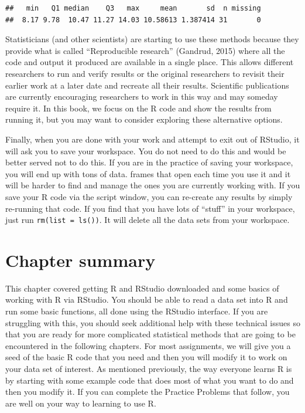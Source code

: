\documentclass[]{book}
\newenvironment{Shaded}{\begin{snugshade}}{\end{snugshade}}
\newcommand{\KeywordTok}[1]{\textcolor[rgb]{0.13,0.29,0.53}{\textbf{{#1}}}}
\newcommand{\NormalTok}[1]{{#1}}
\begin{document}
\begin{Shaded}
\end{Shaded}

\begin{verbatim}
##   min   Q1 median    Q3   max     mean       sd  n missing
##  8.17 9.78  10.47 11.27 14.03 10.58613 1.387414 31       0
\end{verbatim}

Statisticians (and other scientists) are starting to use these methods
because they provide what is called ``Reproducible research'' (Gandrud,
2015) where all the code and output it produced are available in a
single place. This allows different researchers to run and verify
results or the original researchers to revisit their earlier work at a
later date and recreate all their results. Scientific publications are
currently encouraging researchers to work in this way and may someday
require it. In this book, we focus on the R code and show the results
from running it, but you may want to consider exploring these
alternative options.

Finally, when you are done with your work and attempt to exit out of
RStudio, it will ask you to save your workspace. You do not need to do
this and would be better served not to do this. If you are in the
practice of saving your workspace, you will end up with tons of data.
frames that open each time you use it and it will be harder to find and
manage the ones you are currently working with. If you save your R code
via the script window, you can re-create any results by simply
re-running that code. If you find that you have lots of ``stuff'' in
your workspace, just run \texttt{rm(list\ =\ ls())}. It will delete all
the data sets from your workspace.

\section{Chapter summary}\label{chapter-summary}

This chapter covered getting R and RStudio downloaded and some basics of
working with R via RStudio. You should be able to read a data set into R
and run some basic functions, all done using the RStudio interface. If
you are struggling with this, you should seek additional help with these
technical issues so that you are ready for more complicated statistical
methods that are going to be encountered in the following chapters. For
most assignments, we will give you a seed of the basic R code that you
need and then you will modify it to work on your data set of interest.
As mentioned previously, the way everyone learns R is by starting with
some example code that does most of what you want to do and then you
modify it. If you can complete the Practice Problems that follow, you
are well on your way to learning to use R.
\end{document}

